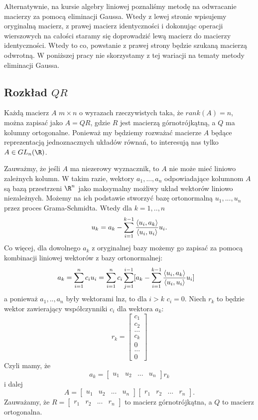 Alternatywnie, na kursie algebry liniowej poznaliśmy metodę na odwracanie macierzy za pomocą eliminacji Gaussa. Wtedy z lewej stronie wpisujemy oryginalną macierz, z prawej macierz identyczności i dokonując operacji wierszowych na całości staramy się doprowadzić lewą macierz do macierzy identyczności. Wtedy to co, powstanie z prawej strony będzie szukaną macierzą odwrotną. W poniższej pracy nie skorzystamy z tej wariacji na tematy metody eliminacji Gaussa.

\subsection{Rozkład $QR$}

Każdą macierz $A$ $m\times n$ o wyrazach rzeczywistych taka, że $rank(A)=n$, można zapisać jako $A=QR$, gdzie $R$ jest macierzą górnotrójkątną, a $Q$ ma kolumny ortogonalne. Ponieważ my będziemy rozważać macierze $A$ będące reprezentacją jednoznacznych układów równań, to interesują nas tylko $A\in GL_n(\R)$.

Zauważmy, że jeśli $A$ ma niezerowy wyznacznik, to $A$ nie może mieć liniowo zależnych kolumn. W takim razie, wektory $a_1,...,a_n$ odpowiadające kolumnom $A$ są bazą przestrzeni $\R^n$ jako maksymalny możliwy układ wektorów liniowo niezależnych. Możemy na ich podstawie stworzyć bazę ortonormalną $u_1,...,u_n$ przez proces Grama-Schmidta. Wtedy dla $k=1,..,n$
$$u_k=a_k-\sum\limits_{i=1}^{k-1}{\langle u_i,a_k\rangle\over \langle u_i,u_i\rangle}u_i.$$
Co więcej, dla dowolnego $a_k$ z oryginalnej bazy możemy go zapisać za pomocą kombinacji liniowej wektorów z bazy ortonormalnej:
\begin{align*}
    a_k&=\sum\limits_{i=1}^n c_iu_i=\sum\limits_{i=1}^nc_i\sum\limits_{j=1}^{i-1} [a_k-\sum\limits_{i=1}^{k-1}{\langle u_i,a_k\rangle\over \langle u_i,u_i\rangle}u_i]
\end{align*}
a ponieważ $a_1,..,a_n$ były wektorami lnz, to dla $i> k$ $c_i=0$. Niech $r_k$ to będzie wektor zawierający współczynniki $c_i$ dla wektora $a_k$:
$$r_k=\begin{bmatrix}
    c_1\\
    c_2\\
    ...\\
    c_k\\
    0\\
    ...\\
    0
\end{bmatrix}$$
Czyli mamy, że
$$a_k=\begin{bmatrix}
    u_1&u_2&...&u_n
\end{bmatrix}r_k
$$
i dalej
$$
A=\begin{bmatrix}
    u_1&u_2&...&u_n
\end{bmatrix}\begin{bmatrix}
    r_1&r_2&...&r_n
\end{bmatrix}.
$$
Zauważamy, że $R=\begin{bmatrix}
    r_1&r_2&...&r_n
\end{bmatrix}$ to macierz górnotrójkątna, a $Q$ to macierz ortogonalna.

